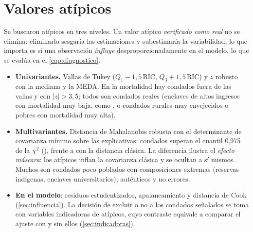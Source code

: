\section{Valores atípicos}\label{sec:atipicos}

Se buscaron atípicos en tres niveles. Un valor atípico \emph{verificado como real} no se elimina:
eliminarlo sesgaría las estimaciones y subestimaría la variabilidad; lo que importa es si una
observación \emph{influye} desproporcionadamente en el modelo, lo que se evalúa en el
\cref{cap:diagnostico}.

\begin{itemize}
  \item \textbf{Univariantes.} Vallas de Tukey ($Q_1-1{,}5\,\mathrm{RIC}$, $Q_3+1{,}5\,\mathrm{RIC}$)
  y $z$ robusto con la mediana y la MEDA. En la mortalidad hay  condados
  fuera de las vallas y  con $|z|>3{,}5$; todos son condados reales
  (enclaves de altos ingresos con mortalidad muy baja, como , o condados rurales
  muy envejecidos o pobres con mortalidad muy alta).
  \item \textbf{Multivariantes.} Distancia de Mahalanobis robusta con el determinante de
  covarianza mínimo \parencite{rousseeuw1999} sobre las  explicativas: 
  condados superan el cuantil 0,975 de la $\chi^2$ (), frente a 
  con la distancia clásica. La diferencia ilustra el \emph{efecto máscara}: los atípicos inflan la
  covarianza clásica y se ocultan a sí mismos. Muchos son condados poco poblados con
  composiciones extremas (reservas indígenas, enclaves universitarios), auténticos y no errores.
  \item \textbf{En el modelo}: residuos estudentizados, apalancamiento y distancia de Cook
  (\cref{sec:influencia}). La decisión de excluir o no a los condados señalados se toma con
  variables indicadoras de atípicos, cuyo contraste equivale a comparar el ajuste con y sin ellos
  (\cref{sec:indicadoras}).
\end{itemize}

